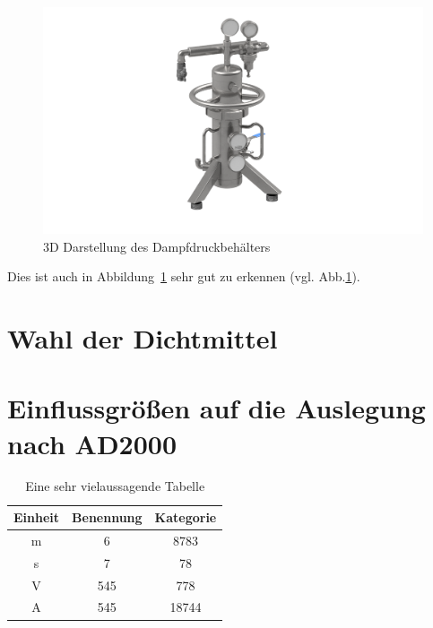 \documentclass[
    12pt, %
    ngerman, %
    a4paper, %
    oneside, %
    headings=big, %
    listof=totoc, %
    bibliography=totoc, %
    index=totoc, %
    captions=tableheading, %
    final %
    sectionentrydots=true,
    toc = bibliography,
]{scrreprt}
\begin{document}
\par

\begin{figure}[htb]
    \centering  
    \includegraphics[keepaspectratio,width=\textwidth,height=\textheight]{render.png}
    \caption{3D Darstellung des Dampfdruckbehälters}\label{fig:render}
\end{figure}

\par

Dies ist auch in Abbildung~\ref{fig:render} sehr gut zu erkennen (vgl. Abb.\ref{fig:render}).

\blindtext[2] \par


\section{Wahl der Dichtmittel}
\blindtext[2] \par

\section{Einflussgrößen auf die Auslegung nach AD2000}
\blindtext[1]

\begin{table}[htb]
\centering
\begin{tabular}{|c|cc|} 
 \hline
 Einheit & Benennung & Kategorie \\ %
 \hline
 m & 6 & 8783 \\ 
 s & 7 & 78 \\
 V & 545 & 778\\
 A & 545 & 18744\\
 \hline
\end{tabular}
\caption{Eine sehr vielaussagende Tabelle}\label{vielaussagend}
\end{table}
\end{document}
